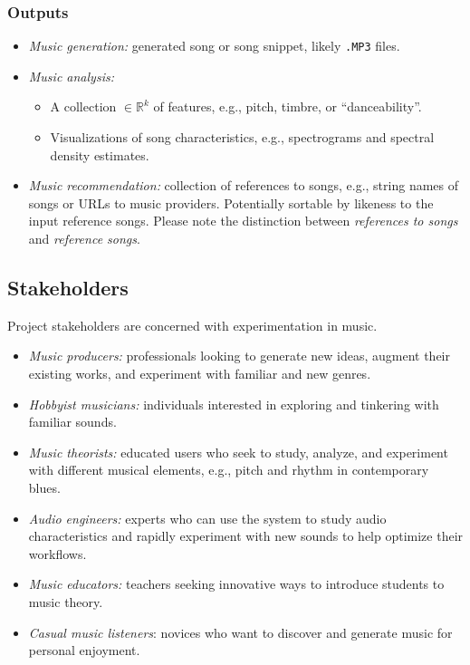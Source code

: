 \documentclass{article}
\begin{document}
\subsubsection{Outputs}
\begin{itemize}
    \item \emph{Music generation:} generated song or song snippet, likely \texttt{.MP3} files.
    \item \emph{Music analysis:}
    \begin{itemize}
        \item A collection $\in \mathbb{R}^k$ of features, e.g., pitch, timbre, or ``danceability''.
        \item Visualizations of song characteristics, e.g., spectrograms and spectral density estimates.
    \end{itemize}
    \item \emph{Music recommendation:} collection of references to songs, e.g., string names of songs or URLs to music providers. Potentially sortable by likeness to the input reference songs. Please note the distinction between \emph{references to songs} and \emph{reference songs}.
\end{itemize}

\subsection{Stakeholders}

Project stakeholders are concerned with experimentation in music.

\begin{itemize}
    \item \emph{Music producers:} professionals looking to generate new ideas, augment their existing works, and experiment with familiar and new genres.
    \item \emph{Hobbyist musicians:} individuals interested in exploring and tinkering with familiar sounds.
    \item \emph{Music theorists:} educated users who seek to study, analyze, and experiment with different musical elements, e.g., pitch and rhythm in contemporary blues.
    \item \emph{Audio engineers:} experts who can use the system to study audio characteristics and rapidly experiment with new sounds to help optimize their workflows.
    \item \emph{Music educators:} teachers seeking innovative ways to introduce students to music theory.
    \item \emph{Casual music listeners}: novices who want to discover and generate music for personal enjoyment.
\end{itemize}
\end{document}
